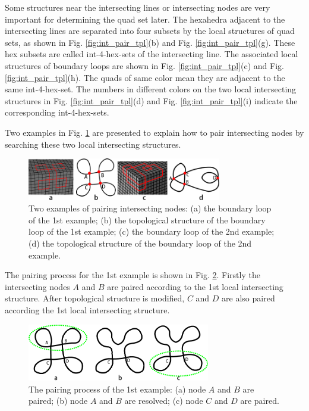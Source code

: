 \documentclass[final,5p,times,twocolumn]{elsarticle}
\begin{document}
Some structures near the intersecting lines or intersecting nodes are very important for determining the quad set later. The hexahedra adjacent to the intersecting lines are separated into four subsets by the local structures of quad sets, as shown in Fig. \ref{fig:int_pair_tpl}(b) and Fig. \ref{fig:int_pair_tpl}(g). These hex subsets are called int-4-hex-sets of the intersecting line. The associated local structures of boundary loops are shown in Fig. \ref{fig:int_pair_tpl}(c) and Fig. \ref{fig:int_pair_tpl}(h). The quads of same color mean they are adjacent to the same int-4-hex-set. The numbers in different colors on the two local intersecting structures in Fig. \ref{fig:int_pair_tpl}(d) and Fig. \ref{fig:int_pair_tpl}(i) indicate the corresponding int-4-hex-sets.

Two examples in Fig. \ref{fig:pair_int_exams} are presented to explain how to pair intersecting nodes by searching these two local intersecting structures.

\begin{figure}[htbp]
\begin{center}
\includegraphics[width=8.5cm]{figures/pmatchexams.png}
\caption{Two examples of pairing intersecting nodes: (a) the boundary loop of the 1st example; (b) the topological structure of the boundary loop of the 1st example; (c) the boundary loop of the 2nd example; (d) the topological structure of the boundary loop of the 2nd example.}
\label{fig:pair_int_exams}
\end{center}
\end{figure}

The pairing process for the 1st example is shown in Fig. \ref{fig:pair_int_exam1_proc}. Firstly the intersecting nodes $A$ and $B$ are paired according to the 1st local intersecting structure. After topological structure is modified, $C$ and $D$ are also paired according the 1st local intersecting structure.

\begin{figure}[htbp]
\begin{center}
\includegraphics[width=8cm]{figures/pmexam1step.png}
\caption{The pairing process of the 1st example: (a) node $A$ and $B$ are paired; (b) node $A$ and $B$ are resolved; (c) node $C$ and $D$ are paired.}
\label{fig:pair_int_exam1_proc}
\end{center}
\end{figure}
\end{document}
